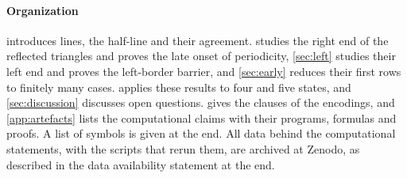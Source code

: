 \paragraph{Organization}
 introduces lines, the half-line and their agreement.
 studies the right end of the reflected triangles and proves
the late onset of periodicity, \cref{sec:left} studies their left end and proves the
left-border barrier, and \cref{sec:early} reduces their first rows to finitely
many cases.  applies these results to four and five
states, and \cref{sec:discussion} discusses open questions.
 gives the clauses of the encodings, and
\cref{app:artefacts} lists the computational claims with their programs,
formulas and proofs. A list of symbols is given at the end. All data behind the
computational statements, with the scripts that rerun them, are archived at
Zenodo, as described in the data availability statement at the end.
